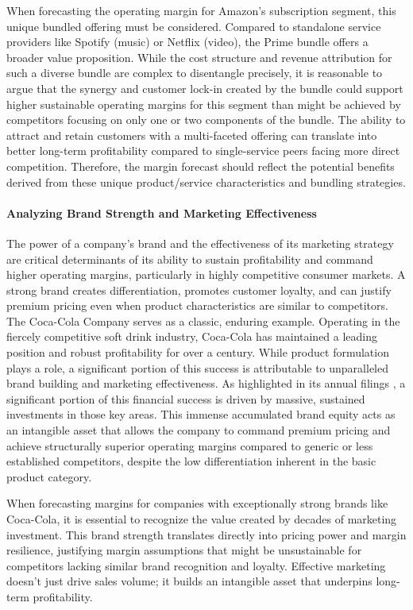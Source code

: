 When forecasting the operating margin for Amazon's subscription segment, this unique bundled offering must be considered. Compared to standalone service providers like Spotify (music) or Netflix (video), the Prime bundle offers a broader value proposition. While the cost structure and revenue attribution for such a diverse bundle are complex to disentangle precisely, it is reasonable to argue that the synergy and customer lock-in created by the bundle could support higher sustainable operating margins for this segment than might be achieved by competitors focusing on only one or two components of the bundle. The ability to attract and retain customers with a multi-faceted offering can translate into better long-term profitability compared to single-service peers facing more direct competition. Therefore, the margin forecast should reflect the potential benefits derived from these unique product/service characteristics and bundling strategies.

\paragraph{Analyzing Brand Strength and Marketing Effectiveness}
The power of a company's brand and the effectiveness of its marketing strategy are critical determinants of its ability to sustain profitability and command higher operating margins, particularly in highly competitive consumer markets. A strong brand creates differentiation, promotes customer loyalty, and can justify premium pricing even when product characteristics are similar to competitors.\\

The Coca-Cola Company serves as a classic, enduring example. Operating in the fiercely competitive soft drink industry, Coca-Cola has maintained a leading position and robust profitability for over a century. While product formulation plays a role, a significant portion of this success is attributable to unparalleled brand building and marketing effectiveness. As highlighted in its annual filings \parencite{cocacola202410k}, a significant portion of this financial success is driven by massive, sustained investments in those key areas. This immense accumulated brand equity acts as an intangible asset that allows the company to command premium pricing and achieve structurally superior operating margins compared to generic or less established competitors, despite the low differentiation inherent in the basic product category.

When forecasting margins for companies with exceptionally strong brands like Coca-Cola, it is essential to recognize the value created by decades of marketing investment. This brand strength translates directly into pricing power and margin resilience, justifying margin assumptions that might be unsustainable for competitors lacking similar brand recognition and loyalty. Effective marketing doesn't just drive sales volume; it builds an intangible asset that underpins long-term profitability.

